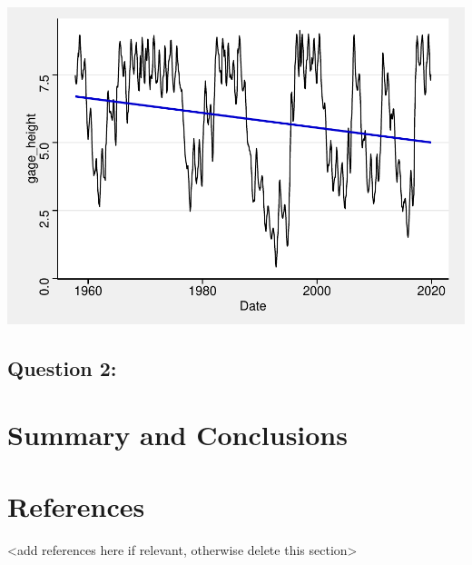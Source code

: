 \documentclass[12pt,]{article}
\let\origfigure\figure
\let\endorigfigure\endfigure
\renewenvironment{figure}[1][2] {
    \expandafter\origfigure\expandafter[H]
} {
    \endorigfigure
}
\begin{document}
\begin{figure}
\centering
\includegraphics{Shintaku_ENV872_Project_files/figure-latex/unnamed-chunk-11-1.pdf}
\caption{Monthly Mean Gage Height Data with Sen's Slope Trend}
\end{figure}

\hypertarget{question-2}{%
\subsection{Question 2:}\label{question-2}}

\newpage

\hypertarget{summary-and-conclusions}{%
\section{Summary and Conclusions}\label{summary-and-conclusions}}

\newpage

\hypertarget{references}{%
\section{References}\label{references}}

\textless{}add references here if relevant, otherwise delete this
section\textgreater{}
\end{document}
